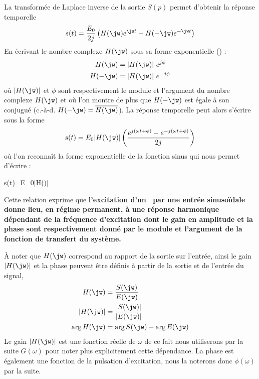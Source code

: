 La transformée de Laplace inverse de la sortie $S(p)$ permet d'obtenir la 
réponse temporelle 
\[
s(t)=\dfrac{E_0}{2j}\left(H(\jw)e^{\jw t}-H(-\jw)e^{-\jw t}\right)
\]
En écrivant le nombre complexe $H(\jw)$ sous sa forme exponentielle 
() :
\begin{align*}
    H(\jw)  &= |H(\jw)| e^{j\phi} \\
    H(-\jw) &= |H(\jw)| e^{-j\phi}
\end{align*}
où $|H(\jw)|$ et $\phi$ sont respectivement le module et l'argument du nombre
complexe $H(\jw)$ 
et où l'on montre de plus que $H(-\jw)$ est égale à son conjugué (c.-à-d. 
$H(-\jw)=\overline{H(\jw)}$).
%
%
%
%
La réponse temporelle peut alors s'écrire sous la forme 
\begin{align*}
s(t)=E_0|H(\jw)|\left(\dfrac{e^{j(\omega t+\phi)}
    -e^{-j(\omega t+\phi)}}{2j}\right)
\end{align*}
où l'on reconnaît la forme exponentielle de la fonction sinus qui nous permet
d'écrire :
\begin{bequation}
    s(t)=E_0|H(\jw)|\label{eq-rh}
\end{bequation}
Cette relation exprime que \textbf{l'excitation d'un {}
~par une entrée sinuso\"idale donne lieu, en régime permanent, à une réponse 
harmonique dépendant de la fréquence d'excitation dont le gain en amplitude et
la phase sont respectivement donné par le module et l'argument de la fonction
de transfert du système.}

\`A noter que $H(\jw)$ correspond au rapport de la sortie sur l'entrée,
ainsi le gain $|H(\jw)|$ et la phase peuvent être définis à partir de la 
sortie et de l'entrée du signal,
\begin{align*}
    H(\jw) &= \dfrac{S(\jw)}{E(\jw)} \\
    |H(\jw)|&= \dfrac{|S(\jw)|}{|E(\jw)|} \\
    \arg{H(\jw)}&=\arg{S(\jw)}-\arg{E(\jw)}
\end{align*}
Le gain $|H(\jw)|$ est une fonction réelle de $\omega$ de ce fait nous 
utiliserons par la suite $G(\omega)$ pour noter plus explicitement cette 
dépendance. La phase est également une fonction de la pulsation d'excitation, 
nous la noterons donc $\phi(\omega)$ par la suite.
\newpage

\captionsetup{width=0.9\linewidth}
